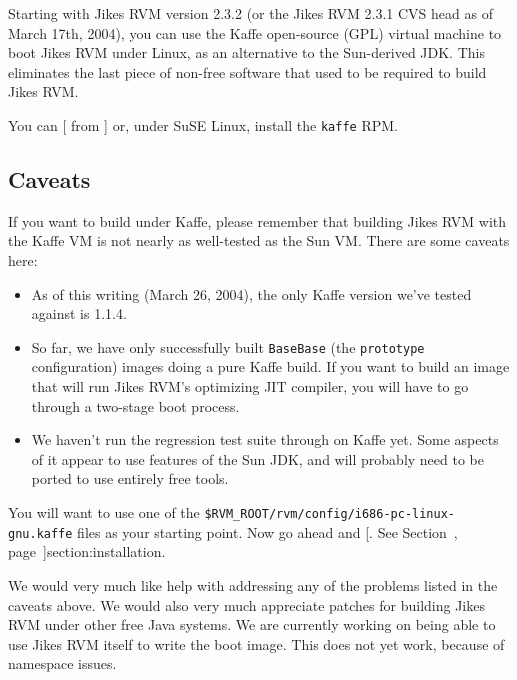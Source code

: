 \newcommand{\rvmbuild}[1]{\$RVM\_BUILD\texttt{/#1}}%
\newcommand{\gft}{\texttt{GenerateFromTemplate}}%
\newcommand{\gid}{\texttt{GenerateInterfaceDeclarations}}%
\newcommand{\biw}{\texttt{BootImageWriter}}%
%
%
Starting with Jikes RVM version 2.3.2 (or the Jikes RVM 2.3.1 CVS head
as of March 17th, 2004), you can use the Kaffe open-source (GPL)
virtual machine to boot Jikes RVM under Linux, as an alternative to
the Sun-derived JDK.  This eliminates the last piece of non-free
software that used to be required to build Jikes RVM.

You can [ from {\tt \KaffeURL}]{\KaffeURL} or,
under SuSE Linux, install the {\tt kaffe} RPM.  

\subsection{Caveats}

If you want to build under Kaffe, please remember that building Jikes
RVM with the Kaffe VM is not nearly as well-tested as the Sun VM.
There are some caveats here:

\begin{itemize}

\item As of this writing (March 26, 2004), the only Kaffe version we've
  tested against is 1.1.4.  

\item So far, we have only successfully built {\tt BaseBase}{\it *}
(the {\tt prototype} configuration) images doing a pure Kaffe build.
If you want to build an image that will run Jikes RVM's optimizing JIT
compiler, you will have to go through a two-stage boot process.


\item We haven't run the regression test suite through on Kaffe yet.
  Some aspects of it appear to use features of the Sun JDK, and will
  probably need to be ported to use entirely free tools.

\end{itemize}

You will want to use one of the 
{\tt \$RVM\_\-ROOT/rvm/config/i686-pc-linux-gnu.kaffe{\it *}} files as
your starting point.  Now go ahead and [.  
  See Section~\Ref, page~\Pageref]{section:installation}. 

We would very much like help with addressing any of the problems
listed in the caveats above.  We would also very much appreciate
patches for building Jikes RVM under other free Java systems.  We are
currently working on being able to use Jikes RVM itself to write the
boot image.  This does not yet work, because of namespace issues.

